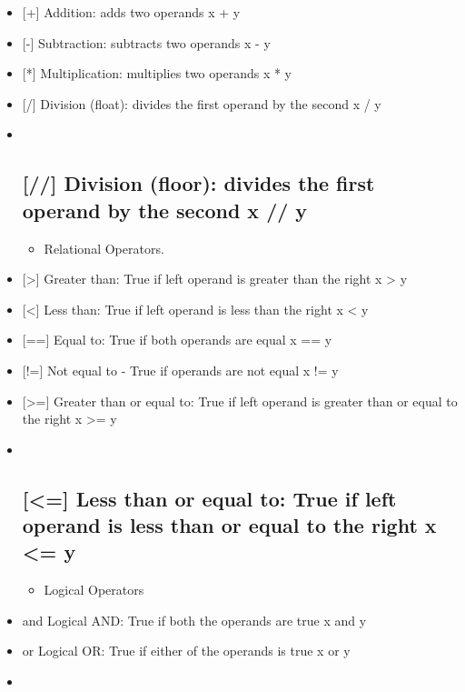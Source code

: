 \documentclass[11pt]{article}
\providecommand{\tightlist}{%
      \setlength{\itemsep}{0pt}\setlength{\parskip}{0pt}}
\begin{document}
\begin{itemize}
\item
  {[}+{]} Addition: adds two operands x + y
\item
  {[}-{]} Subtraction: subtracts two operands x - y
\item
  {[}*{]} Multiplication: multiplies two operands x * y
\item
  {[}/{]} Division (float): divides the first operand by the second x /
  y
\item ~
  \subsection{{[}//{]} Division (floor): divides the first operand by
  the second x //
  y}\label{division-floor-divides-the-first-operand-by-the-second-x-y}

  \begin{itemize}
  \tightlist
  \item
    Relational Operators.
  \end{itemize}
\item
  {[}\textgreater{}{]} Greater than: True if left operand is greater
  than the right x \textgreater{} y
\item
  {[}\textless{}{]} Less than: True if left operand is less than the
  right x \textless{} y
\item
  {[}=={]} Equal to: True if both operands are equal x == y
\item
  {[}!={]} Not equal to - True if operands are not equal x != y
\item
  {[}\textgreater{}={]} Greater than or equal to: True if left operand
  is greater than or equal to the right x \textgreater{}= y
\item ~
  \subsection{{[}\textless{}={]} Less than or equal to: True if left
  operand is less than or equal to the right x \textless{}=
  y}\label{less-than-or-equal-to-true-if-left-operand-is-less-than-or-equal-to-the-right-x-y}

  \begin{itemize}
  \tightlist
  \item
    Logical Operators
  \end{itemize}
\item
  and Logical AND: True if both the operands are true x and y
\item
  or Logical OR: True if either of the operands is true x or y
\item ~

\end{itemize}
\end{document}
